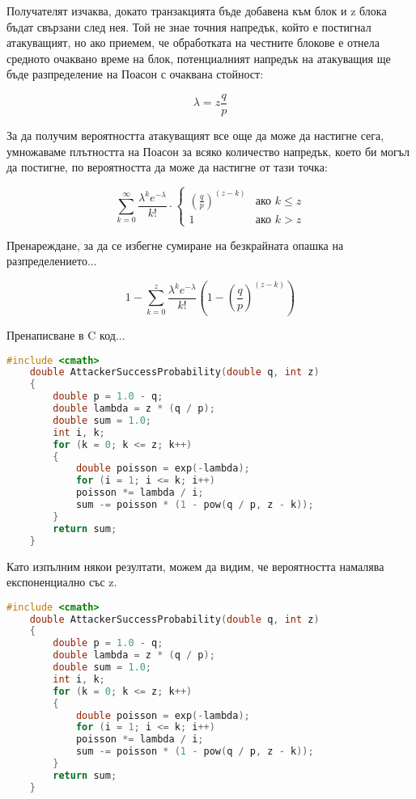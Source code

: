 \documentclass[11pt,a4paper]{article}
\begin{document}
Получателят изчаква, докато транзакцията бъде добавена към блок и z блока бъдат свързани след нея. Той не знае точния напредък, който е постигнал атакуващият, но ако приемем, че обработката на честните блокове е отнела средното очаквано време на блок, потенциалният напредък на атакуващия ще бъде разпределение на Поасон с очаквана стойност:

$$\lambda = z \frac{q}{p}$$

За да получим вероятността атакуващият все още да може да настигне сега, умножаваме плътността на Поасон за всяко количество напредък, което би могъл да постигне, по вероятността да може да настигне от тази точка:

$$
\sum_{k=0}^{\infty} \frac{\lambda^k e^{-\lambda}}{k!} \cdot
\begin{cases}
	\left(\frac{q}{p}\right)^{(z-k)} & \text{ако } k \leq z \\
	1 & \text{ако } k > z
\end{cases}
$$

Пренареждане, за да се избегне сумиране на безкрайната опашка на разпределението...

$$
1 - \sum_{k=0}^{z} \frac{\lambda^k e^{-\lambda}}{k!} \left(1 - \left(\frac{q}{p}\right)^{(z-k)}\right)
$$

Пренаписване в C код...

\begin{lstlisting}[language=C++, caption=Изчисляване на вероятността за успех на атакуващ, basicstyle=\ttfamily\footnotesize, frame=single]
	#include <cmath>
	double AttackerSuccessProbability(double q, int z)
	{
		double p = 1.0 - q;
		double lambda = z * (q / p);
		double sum = 1.0;
		int i, k;
		for (k = 0; k <= z; k++)
		{
			double poisson = exp(-lambda);
			for (i = 1; i <= k; i++)
			poisson *= lambda / i;
			sum -= poisson * (1 - pow(q / p, z - k));
		}
		return sum;
	}
\end{lstlisting}

Като изпълним някои резултати, можем да видим, че вероятността намалява експоненциално със z.

\begin{lstlisting}[language=C++, caption=Изчисляване на вероятността за успех на атакуващ, basicstyle=\ttfamily\footnotesize, frame=single]
	#include <cmath>
	double AttackerSuccessProbability(double q, int z)
	{
		double p = 1.0 - q;
		double lambda = z * (q / p);
		double sum = 1.0;
		int i, k;
		for (k = 0; k <= z; k++)
		{
			double poisson = exp(-lambda);
			for (i = 1; i <= k; i++)
			poisson *= lambda / i;
			sum -= poisson * (1 - pow(q / p, z - k));
		}
		return sum;
	}
\end{lstlisting}
\end{document}
